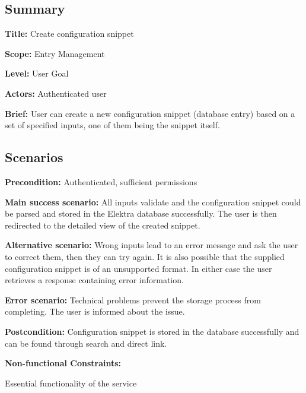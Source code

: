 \subsection*{Summary}


\begin{DoxyItemize}
\item {\bfseries Title\+:} Create configuration snippet
\item {\bfseries Scope\+:} Entry Management
\item {\bfseries Level\+:} User Goal
\item {\bfseries Actors\+:} Authenticated user
\item {\bfseries Brief\+:} User can create a new configuration snippet (database entry) based on a set of specified inputs, one of them being the snippet itself.
\end{DoxyItemize}

\subsection*{Scenarios}


\begin{DoxyItemize}
\item {\bfseries Precondition\+:} Authenticated, sufficient permissions
\item {\bfseries Main success scenario\+:} All inputs validate and the configuration snippet could be parsed and stored in the Elektra database successfully. The user is then redirected to the detailed view of the created snippet.
\item {\bfseries Alternative scenario\+:} Wrong inputs lead to an error message and ask the user to correct them, then they can try again. It is also possible that the supplied configuration snippet is of an unsupported format. In either case the user retrieves a response containing error information.
\item {\bfseries Error scenario\+:} Technical problems prevent the storage process from completing. The user is informed about the issue.
\item {\bfseries Postcondition\+:} Configuration snippet is stored in the database successfully and can be found through search and direct link.
\item {\bfseries Non-\/functional Constraints\+:}
\begin{DoxyItemize}
\item Essential functionality of the service 
\end{DoxyItemize}
\end{DoxyItemize}